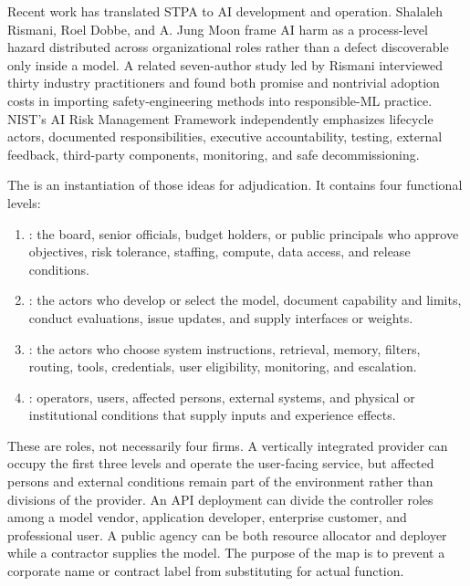 Recent work has translated STPA to AI development and operation. Shalaleh Rismani, Roel Dobbe, and A. Jung Moon frame AI harm as a process-level hazard distributed across organizational roles rather than a defect discoverable only inside a model. A related seven-author study led by Rismani interviewed thirty industry practitioners and found both promise and nontrivial adoption costs in importing safety-engineering methods into responsible-ML practice. NIST's AI Risk Management Framework independently emphasizes lifecycle actors, documented responsibilities, executive accountability, testing, external feedback, third-party components, monitoring, and safe decommissioning.

The \Cascade{} is an instantiation of those ideas for adjudication. It contains four functional levels:

\begin{enumerate}[leftmargin=2.2em]
\item {}: the board, senior officials, budget holders, or public principals who approve objectives, risk tolerance, staffing, compute, data access, and release conditions.
\item {}: the actors who develop or select the model, document capability and limits, conduct evaluations, issue updates, and supply interfaces or weights.
\item {}: the actors who choose system instructions, retrieval, memory, filters, routing, tools, credentials, user eligibility, monitoring, and escalation.
\item {}: operators, users, affected persons, external systems, and physical or institutional conditions that supply inputs and experience effects.
\end{enumerate}

These are roles, not necessarily four firms. A vertically integrated provider can occupy the first three levels and operate the user-facing service, but affected persons and external conditions remain part of the environment rather than divisions of the provider. An API deployment can divide the controller roles among a model vendor, application developer, enterprise customer, and professional user. A public agency can be both resource allocator and deployer while a contractor supplies the model. The purpose of the map is to prevent a corporate name or contract label from substituting for actual function.

